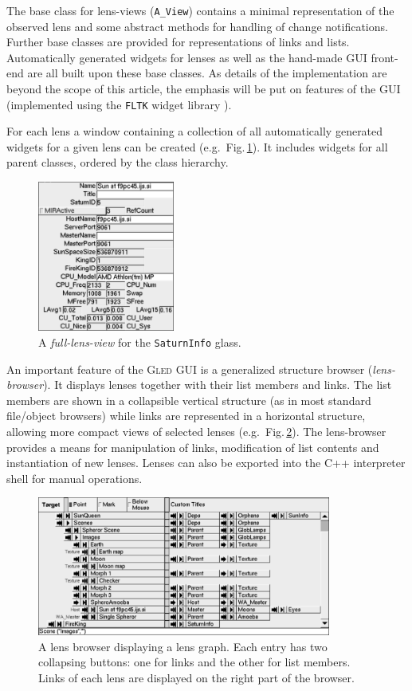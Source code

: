 \documentclass[a4paper,11pt]{article}
\def\gled{\textsc{Gled}\xspace}
\def\smalltt#1{{\small\texttt{#1}}}
\def\foottt#1{{\footnotesize\texttt{#1}}}
\begin{document}
The base class for lens-views (\smalltt{A\_View}) contains a minimal
representation of the observed lens and some abstract methods for handling
of change notifications. Further base classes are provided for
representations of links and lists.
%
Automatically generated widgets for lenses as well as the hand-made GUI
front-end are all built upon these base classes. As details of the
implementation are beyond the scope of this article, the emphasis will
be put on features of the GUI (implemented using the \smalltt{FLTK}
widget library \cite{fltk}).

For each lens a window containing a collection of all automatically
generated widgets for a given lens can be created (e.g.\ 
Fig.\,\ref{fig:full_view}). It includes widgets for all parent
classes, ordered by the class hierarchy.

\begin{figure}
  \centering
  \includegraphics[width=4.5cm]{figs/full_view}
  \caption{A \emph{full-lens-view} for the \foottt{SaturnInfo} glass.}
  \label{fig:full_view}
\end{figure}

An important feature of the \gled GUI is a generalized structure
browser (\emph{lens-browser}). It displays lenses together with their
list members and links. The list members are shown in a collapsible
vertical structure (as in most standard file/object browsers) while
links are represented in a horizontal structure, allowing more compact
views of selected lenses (e.g.\ Fig.\,\ref{fig:link_view}). The
lens-browser provides a means for manipulation of links, modification
of list contents and instantiation of new lenses. Lenses can also be
exported into the C++ interpreter shell for manual operations.

\begin{figure}
  \centering
  \includegraphics[width=0.86\textwidth]{figs/link_view}
  \caption{A lens browser displaying a lens graph. Each entry has two
    collapsing buttons: one for links and the other for list members.
    Links of each lens are displayed on the right part of the
    browser.}
  \label{fig:link_view}
\end{figure}
\end{document}
